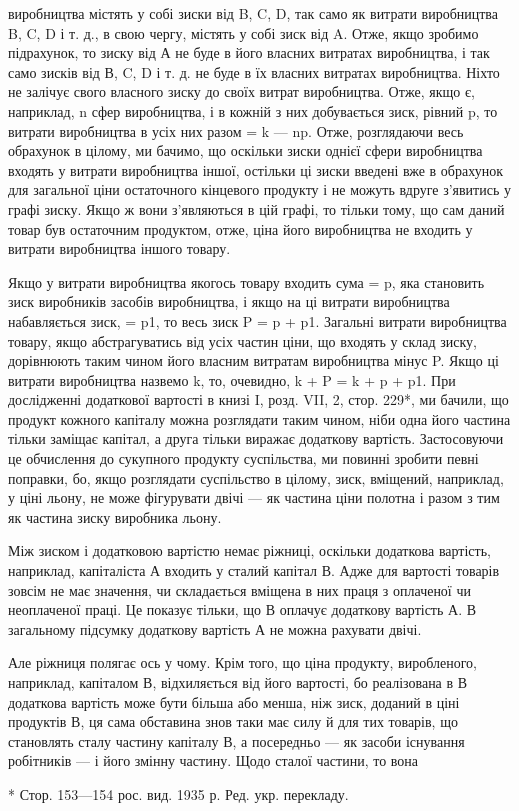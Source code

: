 \parcont{}  %
виробництва містять у собі зиски від B, C, D, так само як витрати виробництва B, C, D і т. д., в
свою чергу, містять у собі
зиск від A. Отже, якщо зробимо підрахунок, то зиску від А не
буде в його власних витратах виробництва, і так само зисків
від В, C, D і т. д. не буде в їх власних витратах виробництва.
Ніхто не залічує свого власного зиску до своїх витрат виробництва. Отже, якщо є, наприклад, n сфер
виробництва, і в кожній з них добувається зиск, рівний p, то витрати виробництва в усіх них разом =
k — np. Отже, розглядаючи весь обрахунок
в цілому, ми бачимо, що оскільки зиски однієї сфери виробництва входять у витрати виробництва іншої,
остільки ці зиски
введені вже в обрахунок для загальної ціни остаточного кінцевого
продукту і не можуть вдруге з’явитись у графі зиску. Якщо ж
вони з’являються в цій графі, то тільки тому, що сам даний
товар був остаточним продуктом, отже, ціна його виробництва
не входить у витрати виробництва іншого товару.

Якщо у витрати виробництва якогось товару входить сума = p, яка становить зиск виробників засобів
виробництва, і якщо
на ці витрати виробництва набавляється зиск, = p1, то весь зиск
P = p + p1. Загальні витрати виробництва товару, якщо абстрагуватись від усіх частин ціни, що
входять у склад зиску, дорівнюють таким чином його власним витратам виробництва мінус P.
Якщо ці витрати виробництва назвемо k, то, очевидно, k + P = k + p + p1. При дослідженні додаткової
вартості в книзі I,
розд. VII, 2, стор. 229*, ми бачили, що продукт кожного капіталу можна розглядати таким чином, ніби
одна його частина
тільки заміщає капітал, а друга тільки виражає додаткову вартість. Застосовуючи це обчислення до
сукупного продукту
суспільства, ми повинні зробити певні поправки, бо, якщо
розглядати суспільство в цілому, зиск, вміщений, наприклад,
у ціні льону, не може фігурувати двічі — як частина ціни полотна
і разом з тим як частина зиску виробника льону.

Між зиском і додатковою вартістю немає ріжниці, оскільки
додаткова вартість, наприклад, капіталіста А входить у сталий
капітал В. Адже для вартості товарів зовсім не має значення, чи
складається вміщена в них праця з оплаченої чи неоплаченої праці.
Це показує тільки, що В оплачує додаткову вартість А. В загальному підсумку додаткову вартість А не
можна рахувати двічі.

Але ріжниця полягає ось у чому. Крім того, що ціна продукту,
виробленого, наприклад, капіталом В, відхиляється від його вартості, бо реалізована в В додаткова
вартість може бути більша
або менша, ніж зиск, доданий в ціні продуктів В, ця сама обставина
знов таки має силу й для тих товарів, що становлять сталу
частину капіталу В, а посередньо — як засоби існування робітників — і його змінну частину. Щодо
сталої частини, то вона

* Стор. 153—154 рос. вид. 1935 р. Ред. укр. перекладу.
\parbreak{}  %
